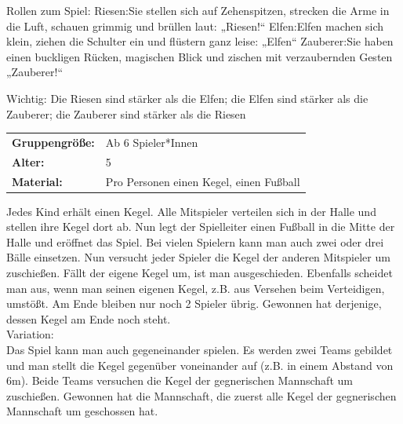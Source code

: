 Rollen zum Spiel: Riesen:Sie stellen sich auf Zehenspitzen, strecken die Arme in die Luft, schauen grimmig und brüllen laut: „Riesen!“ Elfen:Elfen machen sich klein, ziehen die Schulter ein und flüstern ganz leise:  „Elfen“ Zauberer:Sie haben einen buckligen Rücken, magischen Blick und zischen mit verzaubernden Gesten „Zauberer!“\newline

Wichtig: Die Riesen sind stärker als die Elfen; die Elfen sind stärker als die Zauberer; die Zauberer sind stärker als die Riesen \\




\begin{table}[H]
\begin{tabular}{>{\bfseries}lp{8cm}}
   Gruppengröße:   & Ab 6 Spieler*Innen\\
    Alter: & 5 \\
    Material: & Pro Personen einen Kegel, einen Fußball  \\
\end{tabular}
\end{table} 

 Jedes Kind erhält einen Kegel. Alle Mitspieler verteilen sich in der Halle und stellen ihre Kegel dort ab. Nun legt der Spielleiter einen Fußball in die Mitte der Halle und eröffnet das Spiel. Bei vielen Spielern kann man auch zwei oder drei Bälle einsetzen. Nun versucht jeder Spieler die Kegel der anderen Mitspieler um zuschießen. Fällt der eigene Kegel um, ist man ausgeschieden. Ebenfalls scheidet man aus, wenn man seinen eigenen Kegel, z.B. aus Versehen beim Verteidigen, umstößt. Am Ende bleiben nur noch 2 Spieler übrig. Gewonnen hat derjenige, dessen Kegel am Ende noch steht.
 \\ \newline
 Variation: \\ Das Spiel kann man auch gegeneinander spielen. Es werden zwei Teams gebildet und man stellt die Kegel gegenüber voneinander auf (z.B. in einem Abstand von 6m). Beide Teams versuchen die Kegel der gegnerischen Mannschaft um zuschießen. Gewonnen hat die Mannschaft, die zuerst alle Kegel der gegnerischen Mannschaft um geschossen hat.\\


